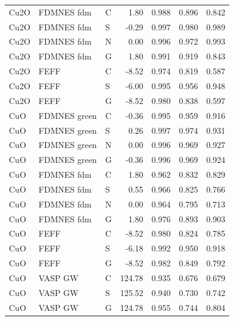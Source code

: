 \begin{longtable}{lllrrrr}
Cu2O & FDMNES fdm & C & 1.80 & 0.988 & 0.896 & 0.842\\
Cu2O & FDMNES fdm & S & -0.29 & 0.997 & 0.980 & 0.989\\
Cu2O & FDMNES fdm & N & 0.00 & 0.996 & 0.972 & 0.993\\
Cu2O & FDMNES fdm & G & 1.80 & 0.991 & 0.919 & 0.843\\
Cu2O & FEFF & C & -8.52 & 0.974 & 0.819 & 0.587\\
Cu2O & FEFF & S & -6.00 & 0.995 & 0.956 & 0.948\\
Cu2O & FEFF & G & -8.52 & 0.980 & 0.838 & 0.597\\
CuO & FDMNES green & C & -0.36 & 0.995 & 0.959 & 0.916\\
CuO & FDMNES green & S & 0.26 & 0.997 & 0.974 & 0.931\\
CuO & FDMNES green & N & 0.00 & 0.996 & 0.969 & 0.927\\
CuO & FDMNES green & G & -0.36 & 0.996 & 0.969 & 0.924\\
CuO & FDMNES fdm & C & 1.80 & 0.962 & 0.832 & 0.829\\
CuO & FDMNES fdm & S & 0.55 & 0.966 & 0.825 & 0.766\\
CuO & FDMNES fdm & N & 0.00 & 0.964 & 0.795 & 0.713\\
CuO & FDMNES fdm & G & 1.80 & 0.976 & 0.893 & 0.903\\
CuO & FEFF & C & -8.52 & 0.980 & 0.824 & 0.785\\
CuO & FEFF & S & -6.18 & 0.992 & 0.950 & 0.918\\
CuO & FEFF & G & -8.52 & 0.982 & 0.849 & 0.792\\
CuO & VASP GW & C & 124.78 & 0.935 & 0.676 & 0.679\\
CuO & VASP GW & S & 125.52 & 0.940 & 0.730 & 0.742\\
CuO & VASP GW & G & 124.78 & 0.955 & 0.744 & 0.804\\
\bottomrule\end{longtable}\normalsize
